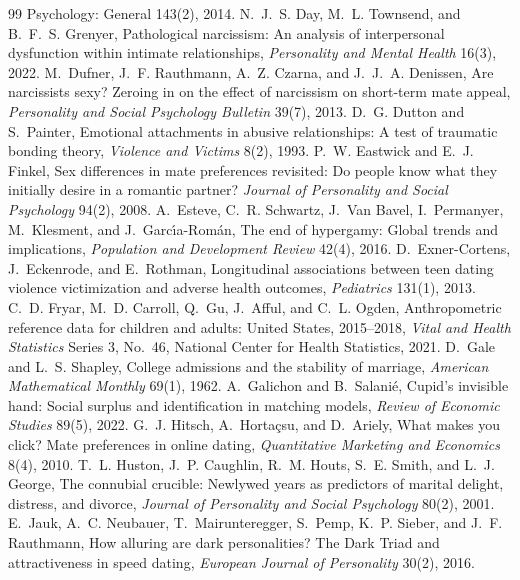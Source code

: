 \documentclass[11pt]{article}
\theoremstyle{definition}
\theoremstyle{remark}
\begin{document}
\begin{thebibliography}{99}
{  Psychology: General} 143(2), 2014.
   N.~J.~S. Day, M.~L. Townsend, and B.~F.~S. Grenyer,
  Pathological narcissism: An analysis of interpersonal dysfunction
  within intimate relationships, \emph{Personality and Mental Health}
  16(3), 2022.
   M.~Dufner, J.~F. Rauthmann, A.~Z. Czarna, and
  J.~J.~A. Denissen, Are narcissists sexy? Zeroing in on the effect of
  narcissism on short-term mate appeal, \emph{Personality and Social
  Psychology Bulletin} 39(7), 2013.
   D.~G. Dutton and S.~Painter, Emotional attachments in
  abusive relationships: A test of traumatic bonding theory,
  \emph{Violence and Victims} 8(2), 1993.
   P.~W. Eastwick and E.~J. Finkel, Sex differences in
  mate preferences revisited: Do people know what they initially desire
  in a romantic partner? \emph{Journal of Personality and Social
  Psychology} 94(2), 2008.
   A.~Esteve, C.~R. Schwartz, J.~Van Bavel,
  I.~Permanyer, M.~Klesment, and J.~Garc\'{\i}a-Rom\'an, The end of
  hypergamy: Global trends and implications, \emph{Population and
  Development Review} 42(4), 2016.
   D.~Exner-Cortens, J.~Eckenrode, and E.~Rothman,
  Longitudinal associations between teen dating violence victimization
  and adverse health outcomes, \emph{Pediatrics} 131(1), 2013.
   C.~D. Fryar, M.~D. Carroll, Q.~Gu, J.~Afful, and
  C.~L. Ogden, Anthropometric reference data for children and adults:
  United States, 2015--2018, \emph{Vital and Health Statistics}
  Series 3, No.~46, National Center for Health Statistics, 2021.
   D.~Gale and L.~S. Shapley, College admissions and
  the stability of marriage, \emph{American Mathematical Monthly} 69(1), 1962.
   A.~Galichon and B.~Salani\'e, Cupid's invisible
  hand: Social surplus and identification in matching models,
  \emph{Review of Economic Studies} 89(5), 2022.
   G.~J. Hitsch, A.~Horta\c{c}su, and D.~Ariely, What
  makes you click? Mate preferences in online dating, \emph{Quantitative
  Marketing and Economics} 8(4), 2010.
   T.~L. Huston, J.~P. Caughlin, R.~M. Houts, S.~E. Smith,
  and L.~J. George, The connubial crucible: Newlywed years as predictors
  of marital delight, distress, and divorce, \emph{Journal of Personality
  and Social Psychology} 80(2), 2001.
   E.~Jauk, A.~C. Neubauer, T.~Mairunteregger, S.~Pemp,
  K.~P. Sieber, and J.~F. Rauthmann, How alluring are dark personalities?
  The Dark Triad and attractiveness in speed dating, \emph{European
  Journal of Personality} 30(2), 2016.

\end{thebibliography}
\end{document}
